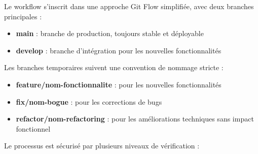 \documentclass[french,12pt]{report} %
\let\oldfigure\figure
\let\endoldfigure\endfigure
\renewenvironment{figure}[1][H]{
    \oldfigure[#1]\centering
}{
    \endoldfigure
}
\begin{document}
\begin{figure}[H]
\begin{mdframed}[style=figstyle]
\end{mdframed}
\caption{Workflow de développement du projet}
\label{fig:workflow-dev}
\end{figure}

Le workflow s'inscrit dans une approche Git Flow simplifiée, avec deux branches principales :

\begin{itemize}
    \item \textbf{main} : branche de production, toujours stable et déployable
    \item \textbf{develop} : branche d'intégration pour les nouvelles fonctionnalités
\end{itemize}

Les branches temporaires suivent une convention de nommage stricte :

\begin{itemize}
    \item \textbf{feature/nom-fonctionnalite} : pour les nouvelles fonctionnalités
    \item \textbf{fix/nom-bogue} : pour les corrections de bugs
    \item \textbf{refactor/nom-refactoring} : pour les améliorations techniques sans impact fonctionnel
\end{itemize}

Le processus est sécurisé par plusieurs niveaux de vérification :
\end{document}
